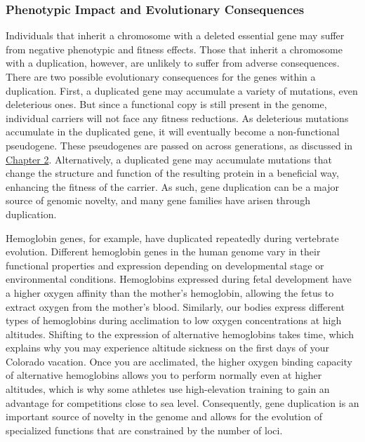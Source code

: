 \documentclass[
]{book}
\begin{document}
\hypertarget{phenotypic-impact-and-evolutionary-consequences-2}{%
\subsubsection*{Phenotypic Impact and Evolutionary Consequences}\label{phenotypic-impact-and-evolutionary-consequences-2}}

Individuals that inherit a chromosome with a deleted essential gene may suffer from negative phenotypic and fitness effects. Those that inherit a chromosome with a duplication, however, are unlikely to suffer from adverse consequences. There are two possible evolutionary consequences for the genes within a duplication. First, a duplicated gene may accumulate a variety of mutations, even deleterious ones. But since a functional copy is still present in the genome, individual carriers will not face any fitness reductions. As deleterious mutations accumulate in the duplicated gene, it will eventually become a non-functional pseudogene. These pseudogenes are passed on across generations, as discussed in \href{evidence-for-evolution.html}{Chapter 2}. Alternatively, a duplicated gene may accumulate mutations that change the structure and function of the resulting protein in a beneficial way, enhancing the fitness of the carrier. As such, gene duplication can be a major source of genomic novelty, and many gene families have arisen through duplication.

Hemoglobin genes, for example, have duplicated repeatedly during vertebrate evolution. Different hemoglobin genes in the human genome vary in their functional properties and expression depending on developmental stage or environmental conditions. Hemoglobins expressed during fetal development have a higher oxygen affinity than the mother's hemoglobin, allowing the fetus to extract oxygen from the mother's blood. Similarly, our bodies express different types of hemoglobins during acclimation to low oxygen concentrations at high altitudes. Shifting to the expression of alternative hemoglobins takes time, which explains why you may experience altitude sickness on the first days of your Colorado vacation. Once you are acclimated, the higher oxygen binding capacity of alternative hemoglobins allows you to perform normally even at higher altitudes, which is why some athletes use high-elevation training to gain an advantage for competitions close to sea level. Consequently, gene duplication is an important source of novelty in the genome and allows for the evolution of specialized functions that are constrained by the number of loci.
\end{document}
